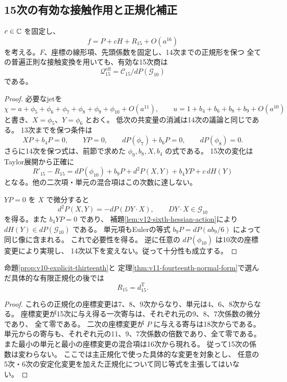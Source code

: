 \subsection{15次の有効な接触作用と正規化補正}
\label{subsec:v12-filtered-contact}

\begin{proposition}[15次の低次安定化群は新しい商方向を与えない]
\label{prop:v12-effective-contact-fifteen}
$c\in\mathbb C$ を固定し、
\[
 f=P+cH+R_{15}+O(a^{16})
\]
を考える。$F$、座標の線形項、先頭係数を固定し、14次までの正規形を保つ
全ての普遍正則な接触変換を用いても、有効な15次商は
\[
 \mathcal Q^{\mathrm{eff}}_{15}
   =\mathcal C_{15}/dP(\mathcal G_{10})
\]
である。
\end{proposition}
\begin{proof}
必要なjetを
\[
 \chi=a+\phi_5+\phi_6+\phi_7+\phi_8+\phi_9+\phi_{10}+O(a^{11}),
 \qquad u=1+b_4+b_6+b_8+b_9+O(a^{10})
\]
と書き、$X=\phi_5$、$Y=\phi_6$ とおく。
低次の共変量の消滅は14次の議論と同じである。
13次までを保つ条件は
\[
 XP+b_4P=0,\qquad YP=0,\qquad
 dP(\phi_7)+b_6P=0,\qquad dP(\phi_8)=0.
\]
さらに14次を保つ式は、前節で求めた
$\phi_9,b_8,X,b_4$ の式である。
15次の変化はTaylor展開から正確に
\[
 R'_{15}-R_{15}
 =dP(\phi_{10})+b_9P+d^2P(X,Y)+b_4YP+c\,dH(Y)
\]
となる。他の二次項・単元の混合項はこの次数に達しない。

$YP=0$ を $X$ で微分すると
\[
 d^2P(X,Y)=-dP(DY\cdot X),\qquad DY\cdot X\in\mathcal G_{10}
\]
を得る。また $b_4YP=0$ であり、
補題\ref{lem:v12-sixth-hessian-action}により
$dH(Y)\in dP(\mathcal G_{10})$ である。
単元項もEulerの等式 $b_9P=dP(ab_9/6)$ によって同じ像に含まれる。
これで必要性を得る。
逆に任意の $dP(\phi_{10})$ は10次の座標変更により実現し、
14次以下を変えない。従って十分性も成立する。
\end{proof}

\begin{proposition}
\label{prop:v12-actual-fifteen-correction}
命題\ref{prop:v10-explicit-thirteenth}と
定理\ref{thm:v11-fourteenth-normal-form}で選んだ具体的な有限正規化の後では
\[
 R_{15}=d^{\mathrm T}_{15}.
\]
\end{proposition}
\begin{proof}
これらの正規化の座標変更は7、8、9次からなり、単元は4、6、8次からなる。
座標変更が15次に与え得る一次寄与は、それぞれ元の9、8、7次係数の微分であり、
全て零である。
二次の座標変更が $P$ に与える寄与は18次からである。
単元からの寄与も、それぞれ元の11、9、7次係数の倍数であり、全て零である。
また最小の単元と最小の座標変更の混合項は16次から現れる。
従って15次の係数は変わらない。
ここでは主正規化で使った具体的な変更を対象とし、
任意の5次・6次の安定化変更を加えた正規化について同じ等式を主張してはいない。
\end{proof}

